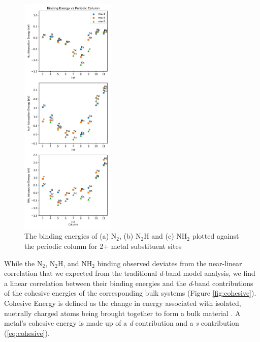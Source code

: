 
\begin{figure}
    \centering
    \includegraphics[width=0.4\textwidth]{Images/adsorption_rows.pdf}
    \caption{The binding energies of (a) N$_2$, (b) N$_2$H and (c) NH$_2$ plotted against the periodic column for 2+ metal substituent sites}
    \label{fig:column_trends}
\end{figure}

While the N$_2$, N$_2$H, and NH$_2$ binding observed deviates from the near-linear correlation that we expected from the traditional \textit{d}-band model analysis, we find a linear correlation between their binding energies and the \textit{d}-band contributions of the cohesive energies of the corresponding bulk systems (Figure \ref{fig:cohesive}). Cohesive Energy is defined as the change in energy associated with isolated, nuetrally charged atoms being brought together to form a bulk material \cite{Laughlin_2014}. A metal's cohesive energy is made up of a \textit{d} contribution and a \textit{s} contribution (\ref{eq:cohesive}). 

